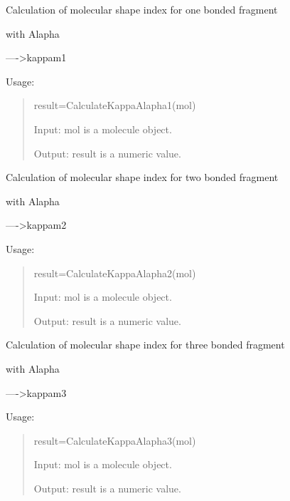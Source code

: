 \documentclass[letterpaper,10pt,english]{sphinxmanual}
\begin{document}

\begin{fulllineitems}
\label{reference/kappa:kappa.CalculateKappaAlapha1}
Calculation of molecular shape index for one bonded fragment

with Alapha

----\textgreater{}kappam1

Usage:
\begin{quote}

result=CalculateKappaAlapha1(mol)

Input: mol is a molecule object.

Output: result is a numeric value.
\end{quote}

\end{fulllineitems}


\begin{fulllineitems}
\label{reference/kappa:kappa.CalculateKappaAlapha2}
Calculation of molecular shape index for two bonded fragment

with Alapha

----\textgreater{}kappam2

Usage:
\begin{quote}

result=CalculateKappaAlapha2(mol)

Input: mol is a molecule object.

Output: result is a numeric value.
\end{quote}

\end{fulllineitems}


\begin{fulllineitems}
\label{reference/kappa:kappa.CalculateKappaAlapha3}
Calculation of molecular shape index for three bonded fragment

with Alapha

----\textgreater{}kappam3

Usage:
\begin{quote}

result=CalculateKappaAlapha3(mol)

Input: mol is a molecule object.

Output: result is a numeric value.
\end{quote}

\end{fulllineitems}
\end{document}
